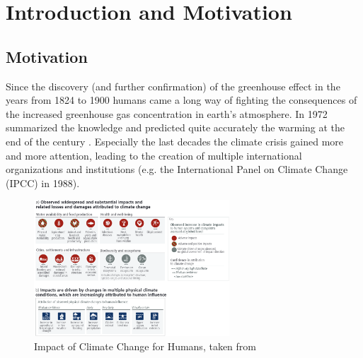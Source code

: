 \chapter{Introduction and Motivation}
\label{ch:intro}


\section{Motivation}
\label{sec:motivation}


Since the discovery (and further confirmation) of the greenhouse effect in the years from 1824 to 1900 \cite{fourier1824remarques, foote1856circumstances} humans came a long way of fighting the consequences of the increased greenhouse gas concentration in earth's atmosphere. 
In 1972 \citeauthor{sawyer1972man} summarized the knowledge and predicted quite accurately the warming at the end of the century \cite{sawyer1972man}.
Especially the last decades the climate crisis gained more and more attention, leading to the creation of multiple international organizations and institutions (e.g. the International Panel on Climate Change (IPCC) in 1988).


\begin{figure}[hbt]
  \begin{center}
    \includegraphics[width=0.65\textwidth]{figures/ipcc_6th_report_impacts_climate_change.png}
  \end{center}
  \caption{Impact of Climate Change for Humans, taken from \cite{lee2024climate}}
  \label{fig:impacts_climate_change}
\end{figure}



